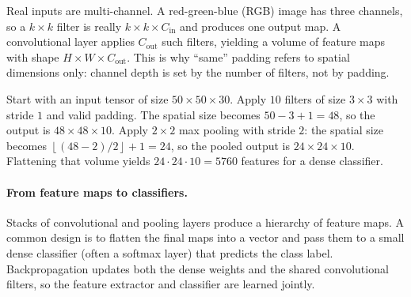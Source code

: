 Real inputs are multi-channel. A red\hyp{}green\hyp{}blue (RGB) image has three channels, so a \(k\times k\) filter is really \(k\times k\times C_{\text{in}}\) and produces one output map. A convolutional layer applies \(C_{\text{out}}\) such filters, yielding a volume of feature maps with shape \(H\times W\times C_{\text{out}}\). This is why ``same'' padding refers to spatial dimensions only: channel depth is set by the number of filters, not by padding.

\begin{tcolorbox}[summarybox, title={Dimensionality accounting example}]
Start with an input tensor of size \(50\times50\times30\). Apply \(10\) filters of size \(3\times3\) with stride \(1\) and valid padding. The spatial size becomes \(50-3+1=48\), so the output is \(48\times48\times10\). Apply \(2\times2\) max pooling with stride \(2\): the spatial size becomes \(\left\lfloor(48-2)/2\right\rfloor + 1 = 24\), so the pooled output is \(24\times24\times10\). Flattening that volume yields \(24\cdot24\cdot10=5760\) features for a dense classifier.
\end{tcolorbox}

\paragraph{From feature maps to classifiers.}
\label{sec:cnn_from_feature_maps_to_classifiers}

Stacks of convolutional and pooling layers produce a hierarchy of feature maps. A common design is to flatten the final maps into a vector and pass them to a small dense classifier (often a softmax layer) that predicts the class label. Backpropagation updates both the dense weights and the shared convolutional filters, so the feature extractor and classifier are learned jointly.

